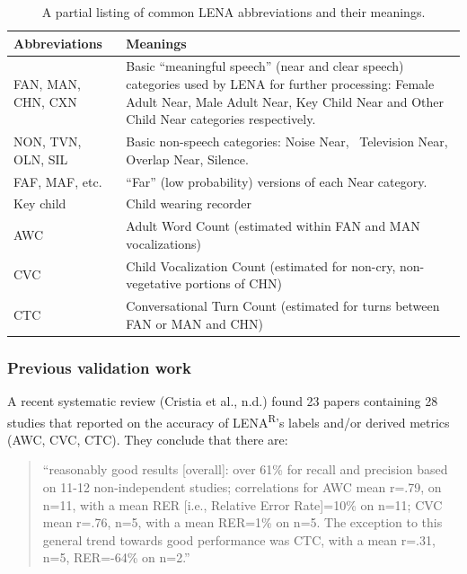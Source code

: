 \documentclass[english,table,man,floatsintext]{apa6}
\begin{document}
\begin{table}[t]

\caption{\label{tab:tab-abb}A partial listing of common LENA abbreviations and their meanings.}
\centering
\begin{tabular}{>{\raggedright\arraybackslash}p{12em}>{\raggedright\arraybackslash}p{28em}}
\toprule
Abbreviations & Meanings\\
\midrule
FAN, MAN, CHN, CXN & Basic “meaningful speech” (near and clear speech) categories used by LENA for further processing: Female Adult Near, Male Adult Near, Key Child Near and Other Child Near categories respectively.\\
NON, TVN, OLN, SIL & Basic non-speech categories: Noise Near,  Television Near, Overlap Near, Silence.\\
FAF, MAF, etc. & “Far” (low probability) versions of each Near category.\\
Key child & Child wearing recorder\\
AWC & Adult Word Count (estimated within FAN and MAN vocalizations)\\
\addlinespace
CVC & Child Vocalization Count (estimated for non-cry, non-vegetative portions of CHN)\\
CTC & Conversational Turn Count (estimated for turns between FAN or MAN and CHN)\\
\bottomrule
\end{tabular}
\end{table}

\hypertarget{previous-validation-work}{%
\subsubsection{Previous validation work}\label{previous-validation-work}}

A recent systematic review (Cristia et al., n.d.) found 23 papers containing 28 studies that reported on the accuracy of LENA\textsuperscript{R}'s labels and/or derived metrics (AWC, CVC, CTC). They conclude that there are:

\begin{quote}
\enquote{reasonably good results {[}overall{]}: over 61\% for recall and precision based on 11-12 non-independent studies; correlations for AWC mean r=.79, on n=11, with a mean RER {[}i.e., Relative Error Rate{]}=10\% on n=11; CVC mean r=.76, n=5, with a mean RER=1\% on n=5. The exception to this general trend towards good performance was CTC, with a mean r=.31, n=5, RER=-64\% on n=2.}
\end{quote}
\end{document}
